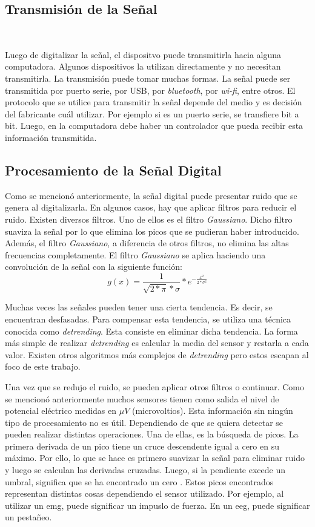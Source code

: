 \subsection{Transmisión de la Señal}\

Luego de digitalizar la señal, el dispositvo puede transmitirla hacia alguna computadora. Algunos dispositivos la utilizan directamente y no necesitan transmitirla. La transmisión puede tomar muchas formas. La señal puede ser transmitida por puerto serie, por USB, por \emph{bluetooth}, por \emph{wi-fi}, entre otros. El protocolo que se utilice para transmitir la señal depende del medio y es decisión del fabricante cuál utilizar. Por ejemplo si es un puerto serie, se transfiere bit a  bit. Luego, en la computadora debe haber un controlador que pueda recibir esta información transmitida.

\subsection{Procesamiento de la Señal Digital}

Como se mencionó anteriormente, la señal digital puede presentar ruido que se genera al digitalizarla. En algunos casos, hay que aplicar filtros para reducir el ruido. Existen diversos filtros. Uno de ellos es el filtro \emph{Gaussiano}. Dicho filtro suaviza la señal por lo que elimina los picos que se pudieran haber introducido. Además, el filtro \emph{Gaussiano}, a diferencia de otros filtros, no elimina las altas frecuencias completamente. El filtro \emph{Gaussiano} se aplica haciendo una convolución de la señal con la siguiente función:
$$ g(x) = \frac{1}{\sqrt{2 * \pi} * \sigma } * e^{-\frac{x^{2}}{2 * \sigma^{2}}} $$

Muchas veces las señales pueden tener una cierta tendencia. Es decir, se encuentran desfasadas. Para compensar esta tendencia, se utiliza una técnica conocida como \emph{detrending}. Esta consiste en eliminar dicha tendencia.  La forma más simple de realizar \emph{detrending} es calcular la media del sensor y restarla a cada valor. Existen otros algoritmos más complejos de \emph{detrending} pero estos escapan al foco de este trabajo.

Una vez que se redujo el ruido, se pueden aplicar otros filtros o continuar. Como se mencionó anteriormente muchos sensores tienen como salida el nivel de potencial eléctrico medidas en $\mu V$ (microvoltios). Esta información sin ningún tipo de procesamiento no es útil. Dependiendo de que se quiera detectar se pueden realizar distintas operaciones. Una de ellas, es la búsqueda de picos. La primera derivada de un pico tiene un cruce descendente igual a cero en su máximo. Por ello, lo que se hace es primero suavizar la señal para eliminar ruido y luego se calculan las derivadas cruzadas. Luego, si la pendiente excede un umbral, significa que se ha encontrado un cero \cite{peak-finding}. Estos picos encontrados representan distintas cosas dependiendo el sensor utilizado. Por ejemplo, al utilizar un \acrshort{emg}, puede significar un impuslo de fuerza. En un \acrshort{eeg}, puede significar un pestañeo.

